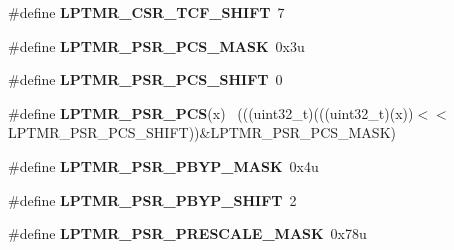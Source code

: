 \begin{DoxyCompactItemize}
\item 
\hypertarget{group___l_p_t_m_r___register___masks_ga0ffa48fac670327deffc2e17ef1dea68}{}\#define {\bfseries L\+P\+T\+M\+R\+\_\+\+C\+S\+R\+\_\+\+T\+C\+F\+\_\+\+S\+H\+I\+F\+T}~7\label{group___l_p_t_m_r___register___masks_ga0ffa48fac670327deffc2e17ef1dea68}

\item 
\hypertarget{group___l_p_t_m_r___register___masks_ga40daa10db43ec0c0a1944e6289ca29cc}{}\#define {\bfseries L\+P\+T\+M\+R\+\_\+\+P\+S\+R\+\_\+\+P\+C\+S\+\_\+\+M\+A\+S\+K}~0x3u\label{group___l_p_t_m_r___register___masks_ga40daa10db43ec0c0a1944e6289ca29cc}

\item 
\hypertarget{group___l_p_t_m_r___register___masks_gaf258bce874ad60601d6d76cefc72c52e}{}\#define {\bfseries L\+P\+T\+M\+R\+\_\+\+P\+S\+R\+\_\+\+P\+C\+S\+\_\+\+S\+H\+I\+F\+T}~0\label{group___l_p_t_m_r___register___masks_gaf258bce874ad60601d6d76cefc72c52e}

\item 
\hypertarget{group___l_p_t_m_r___register___masks_ga6b5b85beaa5760eaa1b5e0fd252bf9a2}{}\#define {\bfseries L\+P\+T\+M\+R\+\_\+\+P\+S\+R\+\_\+\+P\+C\+S}(x)                                              ~(((uint32\+\_\+t)(((uint32\+\_\+t)(x))$<$$<$L\+P\+T\+M\+R\+\_\+\+P\+S\+R\+\_\+\+P\+C\+S\+\_\+\+S\+H\+I\+F\+T))\&L\+P\+T\+M\+R\+\_\+\+P\+S\+R\+\_\+\+P\+C\+S\+\_\+\+M\+A\+S\+K)\label{group___l_p_t_m_r___register___masks_ga6b5b85beaa5760eaa1b5e0fd252bf9a2}

\item 
\hypertarget{group___l_p_t_m_r___register___masks_gab3daae6085cf702b31db5be78fe03872}{}\#define {\bfseries L\+P\+T\+M\+R\+\_\+\+P\+S\+R\+\_\+\+P\+B\+Y\+P\+\_\+\+M\+A\+S\+K}~0x4u\label{group___l_p_t_m_r___register___masks_gab3daae6085cf702b31db5be78fe03872}

\item 
\hypertarget{group___l_p_t_m_r___register___masks_ga4bb5021e396db697f5e597fdcdc222e3}{}\#define {\bfseries L\+P\+T\+M\+R\+\_\+\+P\+S\+R\+\_\+\+P\+B\+Y\+P\+\_\+\+S\+H\+I\+F\+T}~2\label{group___l_p_t_m_r___register___masks_ga4bb5021e396db697f5e597fdcdc222e3}

\item 
\hypertarget{group___l_p_t_m_r___register___masks_ga93a6fe3fb169a73716a837cedb92dbef}{}\#define {\bfseries L\+P\+T\+M\+R\+\_\+\+P\+S\+R\+\_\+\+P\+R\+E\+S\+C\+A\+L\+E\+\_\+\+M\+A\+S\+K}~0x78u\label{group___l_p_t_m_r___register___masks_ga93a6fe3fb169a73716a837cedb92dbef}


\end{DoxyCompactItemize}
